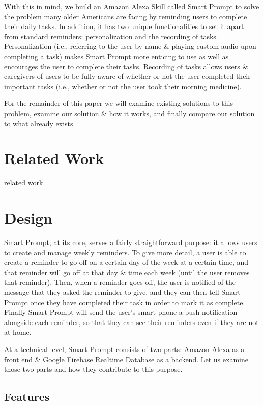 \documentclass[11pt, oneside]{article}
\begin{document}
With this in mind, we build an Amazon Alexa Skill called Smart Prompt to solve the problem many older Americans are facing by reminding users to complete their daily tasks. 
In addition, it has two unique functionalities to set it apart from standard reminders: personalization and the recording of tasks. 
Personalization (i.e., referring to the user by name \& playing custom audio upon completing a task) makes Smart Prompt more enticing to use as well as encourages the user to complete their tasks. 
Recording of tasks allows users \& caregivers of users to be fully aware of whether or not the user completed their important tasks (i.e., whether or not the user took their morning medicine). 

For the remainder of this paper we will examine existing solutions to this problem, examine our solution \& how it works, and finally compare our solution to what already exists. 


\section{Related Work}

related work


\section{Design}

Smart Prompt, at its core, serves a fairly straightforward purpose: it allows users to create and manage weekly reminders. 
To give more detail, a user is able to create a reminder to go off on a certain day of the week at a certain time, and that reminder will go off at that day \& time each week (until the user removes that reminder). 
Then, when a reminder goes off, the user is notified of the message that they asked the reminder to give, and they can then tell Smart Prompt once they have completed their task in order to mark it as complete. 
Finally Smart Prompt will send the user's smart phone a push notification alongside each reminder, so that they can see their reminders even if they are not at home. 

At a technical level, Smart Prompt consists of two parts: Amazon Alexa as a front end \& Google Firebase Realtime Database as a backend. 
Let us examine those two parts and how they contribute to this purpose. 

\subsection{Features}
\end{document}
